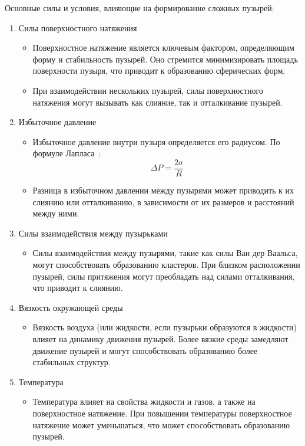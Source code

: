 Основные силы и условия, влияющие на формирование сложных пузырей:
\begin{enumerate}[label={\arabic*)}]
	\item Силы поверхностного натяжения
	\begin{itemize}	
		\item Поверхностное натяжение является ключевым фактором, определяющим форму и стабильность пузырей. Оно стремится минимизировать площадь поверхности пузыря, что приводит к образованию сферических форм.
		\item При взаимодействии нескольких пузырей, силы поверхностного натяжения могут вызывать как слияние, так и отталкивание пузырей.
	\end{itemize}
	\item Избыточное давление
	\begin{itemize}	
		\item Избыточное давление внутри пузыря определяется его радиусом. По формуле Лапласа~\cite{laplace}: \[ \Delta P = \frac{2\sigma}{R} \]
		\item Разница в избыточном давлении между пузырями может приводить к их слиянию или отталкиванию, в зависимости от их размеров и расстояний между ними.
	\end{itemize}
	\item Силы взаимодействия между пузырьками
	\begin{itemize}	
		\item Силы взаимодействия между пузырями, такие как силы Ван дер Ваальса, могут способствовать образованию кластеров. При близком расположении пузырей, силы притяжения могут преобладать над силами отталкивания, что приводит к слиянию.
	\end{itemize}
	\item Вязкость окружающей среды
	\begin{itemize}	
		\item Вязкость воздуха (или жидкости, если пузырьки образуются в жидкости) влияет на динамику движения пузырей. Более вязкие среды замедляют движение пузырей и могут способствовать образованию более стабильных структур.
	\end{itemize}
	\item Температура
	\begin{itemize}	
		\item Температура влияет на свойства жидкости и газов, а также на поверхностное натяжение. При повышении температуры поверхностное натяжение может уменьшаться, что может способствовать образованию пузырей.
	\end{itemize}

\end{enumerate}
